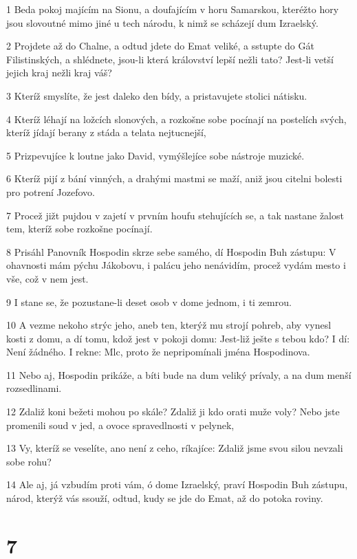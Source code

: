 \par 1 Beda pokoj majícím na Sionu, a doufajícím v horu Samarskou, kteréžto hory jsou slovoutné mimo jiné u tech národu, k nimž se scházejí dum Izraelský.
\par 2 Projdete až do Chalne, a odtud jdete do Emat veliké, a sstupte do Gát Filistinských, a shlédnete, jsou-li která království lepší nežli tato? Jest-li vetší jejich kraj nežli kraj váš?
\par 3 Kteríž smyslíte, že jest daleko den bídy, a pristavujete stolici nátisku.
\par 4 Kteríž léhají na ložcích slonových, a rozkošne sobe pocínají na postelích svých, kteríž jídají berany z stáda a telata nejtucnejší,
\par 5 Prizpevujíce k loutne jako David, vymýšlejíce sobe nástroje muzické.
\par 6 Kteríž pijí z bání vinných, a drahými mastmi se maží, aniž jsou citelni bolesti pro potrení Jozefovo.
\par 7 Procež jižt pujdou v zajetí v prvním houfu stehujících se, a tak nastane žalost tem, kteríž sobe rozkošne pocínají.
\par 8 Prisáhl Panovník Hospodin skrze sebe samého, dí Hospodin Buh zástupu: V ohavnosti mám pýchu Jákobovu, i palácu jeho nenávidím, procež vydám mesto i vše, což v nem jest.
\par 9 I stane se, že pozustane-li deset osob v dome jednom, i ti zemrou.
\par 10 A vezme nekoho strýc jeho, aneb ten, kterýž mu strojí pohreb, aby vynesl kosti z domu, a dí tomu, kdož jest v pokoji domu: Jest-liž ješte s tebou kdo? I dí: Není žádného. I rekne: Mlc, proto že nepripomínali jména Hospodinova.
\par 11 Nebo aj, Hospodin prikáže, a bíti bude na dum veliký prívaly, a na dum menší rozsedlinami.
\par 12 Zdaliž koni bežeti mohou po skále? Zdaliž ji kdo orati muže voly? Nebo jste promenili soud v jed, a ovoce spravedlnosti v pelynek,
\par 13 Vy, kteríž se veselíte, ano není z ceho, ríkajíce: Zdaliž jsme svou silou nevzali sobe rohu?
\par 14 Ale aj, já vzbudím proti vám, ó dome Izraelský, praví Hospodin Buh zástupu, národ, kterýž vás ssouží, odtud, kudy se jde do Emat, až do potoka roviny.

\chapter{7}

